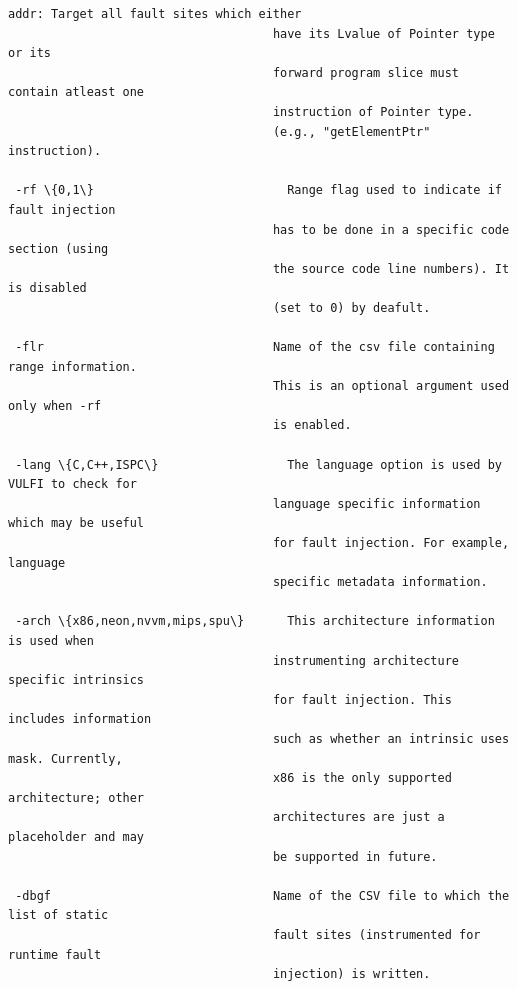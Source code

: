 \documentclass[12pt,a4paper]{article}
\begin{document}
\begin{Verbatim}[fontsize=\relsize{-1},frame=single,framerule=0.1mm,commandchars=\\\{\}]
                                     addr: Target all fault sites which either
                                     have its Lvalue of Pointer type or its
                                     forward program slice must contain atleast one 
                                     instruction of Pointer type.
                                     (e.g., "getElementPtr" instruction).

 -rf \{0,1\}                           Range flag used to indicate if fault injection 
                                     has to be done in a specific code section (using 
                                     the source code line numbers). It is disabled 
                                     (set to 0) by deafult.
 
 -flr                                Name of the csv file containing range information. 
                                     This is an optional argument used only when -rf 
                                     is enabled. 
 
 -lang \{C,C++,ISPC\}                  The language option is used by VULFI to check for 
                                     language specific information which may be useful 
                                     for fault injection. For example, language 
                                     specific metadata information.
 
 -arch \{x86,neon,nvvm,mips,spu\}      This architecture information is used when 
                                     instrumenting architecture specific intrinsics 
                                     for fault injection. This includes information 
                                     such as whether an intrinsic uses mask. Currently, 
                                     x86 is the only supported architecture; other 
                                     architectures are just a placeholder and may
                                     be supported in future. 
 
 -dbgf                               Name of the CSV file to which the list of static 
                                     fault sites (instrumented for runtime fault 
                                     injection) is written.
\end{Verbatim}
\end{document}
